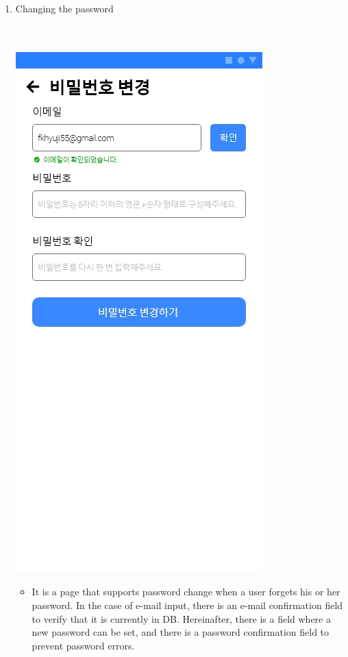 \documentclass[conference]{IEEEtran}
\begin{document}
\begin{enumerate}
    \item Changing the password \\ \\ \\
    \centerline{\includegraphics[scale=0.32]{3-2. 비밀번호 변경.jpg}}
    \begin{itemize}
    \item[] It is a page that supports password change when a user forgets his or her password. In the case of e-mail input, there is an e-mail confirmation field to verify that it is currently in DB. Hereinafter, there is a field where a new password can be set, and there is a password confirmation field to prevent password errors. \\ \\
    \end{itemize}
    \end{enumerate}{}
    
\end{document}
